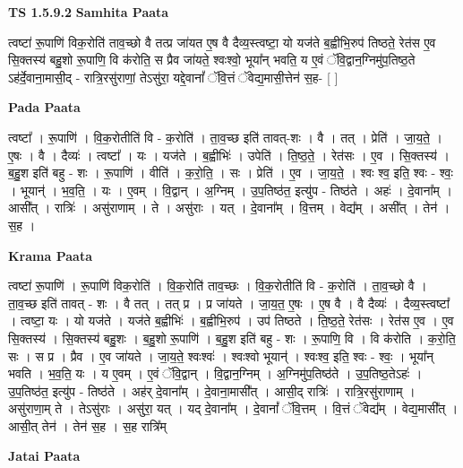 \documentclass[17pt]{extarticle}
\begin{document}
\textbf{TS 1.5.9.2 } \newline
\textbf{Samhita Paata} \newline

त्वष्टा॑ रू॒पाणि॑ विक॒रोति॑ ताव॒च्छो वै तत्प्र जा॑यत ए॒ष वै दैव्य॒स्त्वष्टा॒ यो यज॑ते ब॒ह्वीभि॒रुप॑ तिष्ठते॒ रेत॑स ए॒व सि॒क्तस्य॑ बहु॒शो रू॒पाणि॒ वि क॑रोति॒ स प्रैव जा॑यते॒ श्वःश्वो॒ भूया᳚न् भवति॒ य ए॒वं ॅवि॒द्वान॒ग्निमु॑प॒तिष्ठ॒ते ऽह॑र्दे॒वाना॒मासी॒द् - रात्रि॒रसु॑राणां॒ तेऽसु॑रा॒ यद्दे॒वानां᳚ ॅवि॒त्तं ॅवेद्य॒मासी॒त्तेन॑ स॒ह- [ ] \newline

\textbf{Pada Paata} \newline

त्वष्टा᳚ । रू॒पाणि॑ । वि॒क॒रोतीति॑ वि - क॒रोति॑ । ता॒व॒च्छ इति॑ तावत्-शः । वै । तत् । प्रेति॑ । जा॒य॒ते॒ । ए॒षः । वै । दैव्यः॑ । त्वष्टा᳚ । यः । यज॑ते । ब॒ह्वीभिः॑ । उपेति॑ । ति॒ष्ठ॒ते॒ । रेत॑सः । ए॒व । सि॒क्तस्य॑ । ब॒हु॒श इति॑ बहु - शः । रू॒पाणि॑ । वीति॑ । क॒रो॒ति॒ । सः । प्रेति॑ । ए॒व । जा॒य॒ते॒ । श्वः श्व॒ इति॒ श्वः - श्वः॒ । भूयान्॑ । भ॒व॒ति॒ । यः । ए॒वम् । वि॒द्वान् । अ॒ग्निम् । उ॒प॒तिष्ठ॑त॒ इत्यु॑प - तिष्ठ॑ते । अहः॑ । दे॒वाना᳚म् । आसी᳚त् । रात्रिः॑ । असु॑राणाम् । ते । असु॑राः । यत् । दे॒वाना᳚म् । वि॒त्तम् । वेद्य᳚म् । असी᳚त् । तेन॑ । स॒ह ।  \newline


\textbf{Krama Paata} \newline

त्वष्टा॑ रू॒पाणि॑ । रू॒पाणि॑ विक॒रोति॑ । वि॒क॒रोति॑ ताव॒च्छः । वि॒क॒रोतीति॑ वि - क॒रोति॑ । ता॒व॒च्छो वै । ता॒व॒च्छ इति॑ तावत् - शः । वै तत् । तत् प्र । प्र जा॑यते । जा॒य॒त॒ ए॒षः । ए॒ष वै । वै दैव्यः॑ । दैव्य॒स्त्वष्टा᳚ । त्वष्टा॒ यः । यो यज॑ते । यज॑ते ब॒ह्वीभिः॑ । ब॒ह्वीभि॒रुप॑ । उप॑ तिष्ठते । ति॒ष्ठ॒ते॒ रेत॑सः । रेत॑स ए॒व । ए॒व सि॒क्तस्य॑ । सि॒क्तस्य॑ बहु॒शः । ब॒हु॒शो रू॒पाणि॑ । ब॒हु॒श इति॑ बहु - शः । रू॒पाणि॒ वि । वि क॑रोति । क॒रो॒ति॒ सः । स प्र । प्रैव । ए॒व जा॑यते । जा॒य॒ते॒ श्वःश्वः॑ । श्वःश्वो भूयान्॑ । श्वःश्व॒ इति॒ श्वः - श्वः॒ । भूया᳚न् भवति । भ॒व॒ति॒ यः । य ए॒वम् । ए॒वं ॅवि॒द्वान् । वि॒द्वान॒ग्निम् । अ॒ग्निमु॑प॒तिष्ठ॑ते । उ॒प॒तिष्ठ॒तेऽहः॑ । उ॒प॒तिष्ठ॑त॒ इत्यु॑प - तिष्ठ॑ते । अह॑र् दे॒वाना᳚म् । दे॒वाना॒मासी᳚त् । आसी॒द् रात्रिः॑ । रात्रि॒रसु॑राणाम् । असु॑राणा॒म् ते । तेऽसु॑राः । असु॑रा॒ यत् । यद् दे॒वाना᳚म् । दे॒वानां᳚ ॅवि॒त्तम् । वि॒त्तं ॅवेद्य᳚म् । वेद्य॒मासी᳚त् । आसी॒त् तेन॑ । तेन॑ स॒ह । स॒ह रात्रि᳚म् \newline

\textbf{Jatai Paata} \newline
\end{document}
